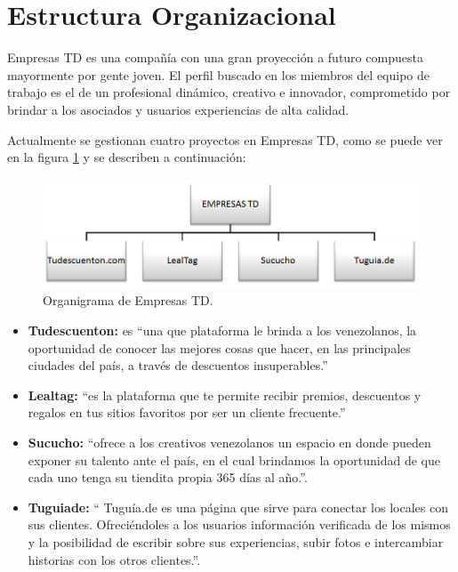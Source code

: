 \section{Estructura Organizacional} \label{sect:Estructura_organizacional}

Empresas TD es una compañía con una gran proyección a futuro compuesta mayormente 
por gente joven. El perfil buscado en los miembros del equipo de trabajo es el de 
un profesional dinámico, creativo e innovador, comprometido por brindar a los
asociados y usuarios experiencias de alta calidad. 

Actualmente se gestionan cuatro proyectos en Empresas TD, como se puede ver en la figura \ref{fig:ogtd} y se describen a continuación:

\begin{figure}[h]
	\begin{center}
		\includegraphics[scale=0.4]{imagenes/OrganigramaTD.png}
	\end{center}
	\caption{
		\label{fig:ogtd}
		Organigrama de Empresas TD.
	}
\end{figure}

\begin{itemize}
  \item \textbf{Tudescuenton:} es ``una que plataforma le brinda a los venezolanos, la oportunidad de conocer las mejores cosas que hacer, en las principales ciudades del país, a través de descuentos insuperables.'' \cite{TDC}
  \item \textbf{Lealtag:} ``es la plataforma que te permite recibir premios, descuentos y regalos en tus sitios favoritos por ser un cliente frecuente.''\cite{LTG}
  \item \textbf{Sucucho:} ``ofrece a los creativos venezolanos un espacio en donde pueden exponer su talento ante el país, en el cual brindamos la oportunidad de que cada uno tenga su tiendita propia 365 días al año.''\cite{SCC}.
  \item \textbf{Tuguiade:} `` Tuguía.de es una página que sirve para conectar los locales con sus clientes. Ofreciéndoles a los usuarios información verificada de los mismos y la posibilidad de escribir sobre sus experiencias, subir fotos e intercambiar historias con los otros clientes.''\cite{TGD}. 
\end{itemize}
  
